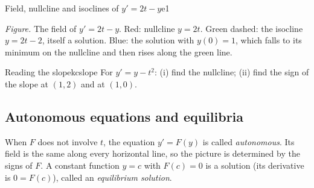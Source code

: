 \documentclass[11pt]{article}
\begin{document}
\begin{exmp}{Field, nullcline and isoclines of $y'=2t-y$}{e1}
\begin{center}
\par\small\emph{Figure.} The field of $y'=2t-y$. Red: nullcline $y=2t$. Green dashed: the isocline $y=2t-2$, itself a solution. Blue: the solution with $y(0)=1$, which falls to its minimum on the nullcline and then rises along the green line.
\end{center}
\end{exmp}

\begin{kc}{Reading the slope}{kcslope}
For $y'=y-t^2$: (i) find the nullcline; (ii) find the sign of the slope at $(1,2)$ and at $(1,0)$.
\end{kc}

\subsection*{Autonomous equations and equilibria}

When $F$ does not involve $t$, the equation $y'=F(y)$ is called \emph{autonomous}. Its field is the same along every horizontal line, so the picture is determined by the signs of $F$. A constant function $y=c$ with $F(c)=0$ is a solution (its derivative is $0=F(c)$), called an \emph{equilibrium solution}.
\end{document}
